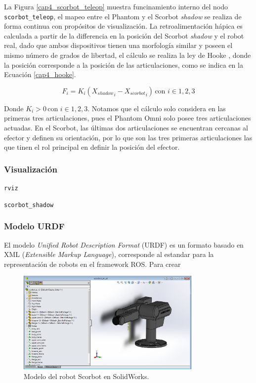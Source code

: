 La Figura \ref{cap4_scorbot_teleop} muestra funcinamiento interno del nodo \texttt{scorbot\_teleop}, el mapeo entre el Phantom y el Scorbot \textit{shadow} se realiza de forma continua con propósitos de visualización. La retroalimentación hápica es calculada a partir de la differencia en la posición del Scorbot \textit{shadow} y el robot real, dado que ambos dispositivos tienen una morfología similar y poseen el mismo número de grados de libertad, el cálculo se realiza la ley de Hooke \cite{handbook}, donde la posición corresponde a la posición de las articulaciones, como se indica en la Ecuación \ref{cap4_hooke}.

\begin{equation}\label{cap4_hooke}
F_i = K_i({X_{shadow}}_i - {X_{scorbot}}_i) \, \mbox{con } i \in {1,2,3}
\end{equation}

Donde $K_i > 0 \, \mbox{con } i \in {1,2,3}$. Notamos que el cálculo solo considera en las primeras tres articulaciones, pues el Phantom Omni solo posee tres articulaciones actuadas. En el Scorbot, las últimas dos articulaciones se encuentran cercanas al efector y definen su orientación, por lo que son las tres primeras articulaciones las que tinen el rol principal en definir la posición del efector.

\subsubsection{Visualización}



\texttt{rviz}

\texttt{scorbot\_shadow}


\subsubsection{Modelo URDF}

El modelo \textit{Unified Robot Description Format} (URDF) es un formato basado en XML (\textit{Extensible Markup Language}), corresponde al estandar para la representación de robots en el framework ROS. Para crear 

\begin{figure}[H]
  \centering
  \includegraphics[width=0.8\textwidth]{img/cap4/cad_solidworks.PNG}
  \caption{Modelo del robot Scorbot en SolidWorks.}
  \label{cap4_scorbot_cad}
\end{figure}



